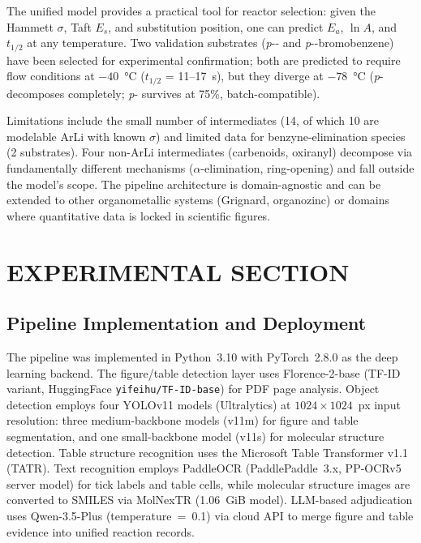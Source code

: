 \documentclass[journal=jcisd8,manuscript=article]{achemso}
\begin{document}
The unified model provides a practical tool for reactor selection: given the Hammett $\sigma$, Taft $E_s$, and substitution position, one can predict $E_a$, $\ln A$, and $t_{1/2}$ at any temperature.
Two validation substrates (\textit{p}-- and \textit{p}--bromobenzene) have been selected for experimental confirmation; both are predicted to require flow conditions at $-40$~\si{\celsius} ($t_{1/2}$ = 11--17~s), but they diverge at $-78$~\si{\celsius} (\textit{p}- decomposes completely; \textit{p}- survives at 75\%, batch-compatible).

Limitations include the small number of intermediates (14, of which 10 are modelable ArLi with known $\sigma$) and limited data for benzyne-elimination species (2 substrates).
Four non-ArLi intermediates (carbenoids, oxiranyl) decompose via fundamentally different mechanisms ($\alpha$-elimination, ring-opening) and fall outside the model's scope.
The pipeline architecture is domain-agnostic and can be extended to other organometallic systems (Grignard, organozinc) or domains where quantitative data is locked in scientific figures.

\section{EXPERIMENTAL SECTION}

\subsection{Pipeline Implementation and Deployment}
The pipeline was implemented in Python~3.10 with PyTorch~2.8.0 as the deep learning backend.
The figure/table detection layer uses Florence-2-base\cite{Xiao2024florence2} (TF-ID variant, HuggingFace \texttt{yifeihu/TF-ID-base}) for PDF page analysis.
Object detection employs four YOLOv11 models (Ultralytics) at $1024 \times 1024$~px input resolution: three medium-backbone models (v11m) for figure and table segmentation, and one small-backbone model (v11s) for molecular structure detection.
Table structure recognition uses the Microsoft Table Transformer v1.1 (TATR).\cite{smock2022tatr}
Text recognition employs PaddleOCR (PaddlePaddle~3.x, PP-OCRv5 server model) for tick labels and table cells, while molecular structure images are converted to SMILES via MolNexTR (1.06~GiB model).\cite{Xu2024molnextr}
LLM-based adjudication uses Qwen-3.5-Plus (temperature~=~0.1) via cloud API to merge figure and table evidence into unified reaction records.
\end{document}
